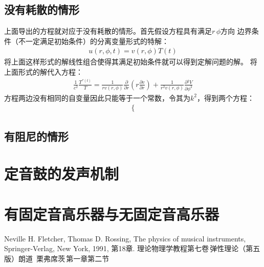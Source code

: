 \documentclass[a4paper]{ctexart}
\newcommand{\pdv}[2]{\frac{\partial{#1}}{\partial{#2}}}
\begin{document}
	\subsection{没有耗散的情形}
	上面导出的方程就对应于没有耗散的情形。首先假设方程具有满足$r\, \phi$方向
	边界条件（不一定满足初始条件）的分离变量形式的特解：
	\begin{align}
		u(r, \phi, t) = v(r, \phi)T(t)
	\end{align}
	将上面这样形式的解线性组合使得其满足初始条件就可以得到定解问题的解。
	将上面形式的解代入方程：
	\begin{align}
		\frac{1}{c^2}\frac{T^{''(t)}}{T} = \frac{1}{rv(r,\phi)}\pdv{}{r}\left(r\pdv{v}{r}\right)
		 + \frac{1}{r^2 v(r,\phi)}\pdv{^2 V}{\phi^2}
	\end{align}
	方程两边没有相同的自变量因此只能等于一个常数，令其为$k^2$，得到两个方程：
	\begin{align}
		\left\{

		\right.
	\end{align}
	\subsection{有阻尼的情形}
	\section{定音鼓的发声机制}
	\section{有固定音高乐器与无固定音高乐器}
	\begin{thebibliography}{99}
		Neville H. Fletcher, Thomas D. Rossing, The physics of musical instruments, Springer-Verlag, New York, 1991, 第18章.
		理论物理学教程第七卷\,弹性理论（第五版）朗道\, 栗弗席茨\,第一章第二节
	\end{thebibliography}
\end{document}
